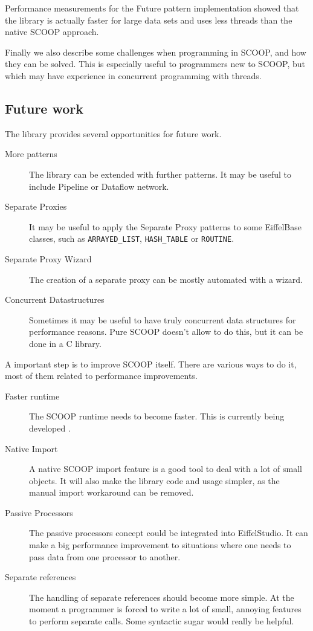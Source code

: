 \documentclass[a4paper,10pt]{article}
\newcommand{\todoref}{\todo{ref}}
\begin{document}
Performance measurements for the Future pattern implementation showed that the library is actually faster for large data sets and uses less threads than the native SCOOP approach.

Finally we also describe some challenges when programming in SCOOP, and how they can be solved.
This is especially useful to programmers new to SCOOP, but which may have experience in concurrent programming with threads.

\subsection{Future work}

The library provides several opportunities for future work.

\begin{description}
 \item [More patterns] The library can be extended with further patterns.
 It may be useful to include Pipeline or Dataflow network.
 \item [Separate Proxies] It may be useful to apply the Separate Proxy patterns to some EiffelBase classes, such as \lstinline!ARRAYED_LIST!, \lstinline!HASH_TABLE! or \lstinline!ROUTINE!.
 \item [Separate Proxy Wizard] The creation of a separate proxy can be mostly automated with a wizard.
 \item [Concurrent Datastructures] Sometimes it may be useful to have truly concurrent data structures for performance reasons.
 Pure SCOOP doesn't allow to do this, but it can be done in a C library. 
\end{description}

A important step is to improve SCOOP itself.
There are various ways to do it, most of them related to performance improvements.

\begin{description}
 \item [Faster runtime] The SCOOP runtime needs to become faster. 
 This is currently being developed \todoref.
 \item [Native Import] A native SCOOP import feature is a good tool to deal with a lot of small objects.
 It will also make the library code and usage simpler, as the manual import workaround can be removed.
 \item [Passive Processors] The passive processors concept could be integrated into EiffelStudio.
 It can make a big performance improvement to situations where one needs to pass data from one processor to another.
 \item [Separate references] The handling of separate references should become more simple.
 At the moment a programmer is forced to write a lot of small, annoying features to perform separate calls.
 Some syntactic sugar would really be helpful.
\end{description}



\begin{appendices}


\end{appendices}

\todos
\end{document}
